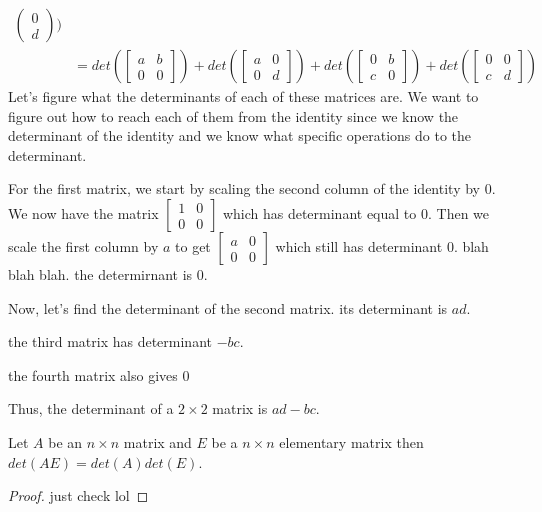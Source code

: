 \begin{example}
\begin{align*}
\begin{pmatrix}
        0 \\ d
    \end{pmatrix})\tag{by Multilinearity}\\
    &=det(\begin{bmatrix}
        a & b \\
        0 & 0
    \end{bmatrix})+det(\begin{bmatrix}
        a & 0 \\
        0 & d
    \end{bmatrix})+det(\begin{bmatrix}
        0 & b \\
        c & 0
    \end{bmatrix})+det(\begin{bmatrix}
        0 & 0 \\
        c & d
    \end{bmatrix})
    \end{align*}
    Let's figure what the determinants of each of these matrices are. We want to figure out how to reach each of them from the identity since we know the determinant of the identity and we know what specific operations do to the determinant. 
    
    For the first matrix, we start by scaling the second column of the identity by $0$. We now have the matrix $\begin{bmatrix}
        1 & 0\\
        0 & 0
    \end{bmatrix}$ which has determinant equal to $0$. Then we scale the first column by $a$ to get $\begin{bmatrix}
        a & 0\\
        0 & 0
    \end{bmatrix}$ which still has determinant $0$. blah blah blah. the determirnant is 0.

    Now, let's find the determinant of the second matrix. its determinant is $ad$.

    the third matrix has determinant $-bc$.

    the fourth matrix also gives $0$

    Thus, the determinant of a $2\times 2$ matrix is $ad-bc$.
\end{example}
\begin{lemma}
    Let $A$ be an $n\times n$ matrix and $E$ be a $n\times n$ elementary matrix then $det(AE)=det(A)det(E)$.
\end{lemma}
\begin{proof}
    just check lol
\end{proof}
